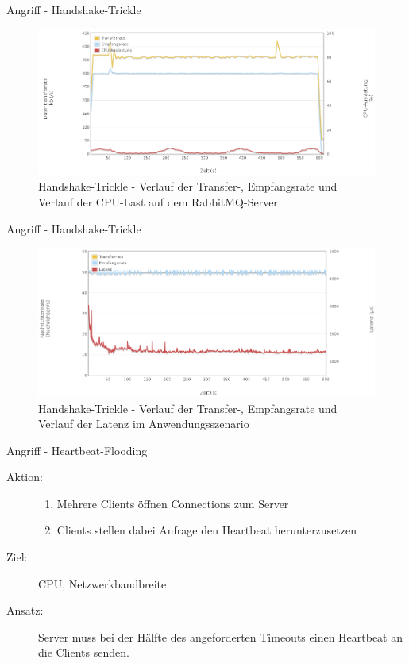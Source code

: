 \documentclass[10pt]{beamer}
\begin{document}
\begin{frame}{Angriff - Handshake-Trickle}		
\begin{figure}[!htb]
	\centering
	\includegraphics[width=\textwidth]{img/handshake/handshake_server2.png}
	\caption{\centering Handshake-Trickle - Verlauf der Transfer-, Empfangsrate und Verlauf der CPU-Last auf dem RabbitMQ-Server}
	\label{fig:handshake-server2}
\end{figure}
\end{frame}

\begin{frame}{Angriff - Handshake-Trickle}		
\begin{figure}[!htb]
	\centering
	\includegraphics[width=\textwidth]{img/handshake/handshake_scenario.png}
	\caption{\centering Handshake-Trickle - Verlauf der Transfer-, Empfangsrate und Verlauf der Latenz im Anwendungsszenario}
	\label{fig:handshake-scenario}
\end{figure}
\end{frame}


\begin{frame}[t]{Angriff - Heartbeat-Flooding}
\begin{description}
	\item[Aktion:]
		\begin{enumerate}
			\item Mehrere Clients öffnen Connections zum Server
			\item Clients stellen dabei Anfrage den Heartbeat herunterzusetzen
		\end{enumerate} \smallskip
	\item[Ziel:] CPU, Netzwerkbandbreite  \smallskip
	\item[Ansatz:] Server muss bei der Hälfte des angeforderten Timeouts einen Heartbeat an die Clients senden.
\end{description}
\end{frame}
\end{document}
